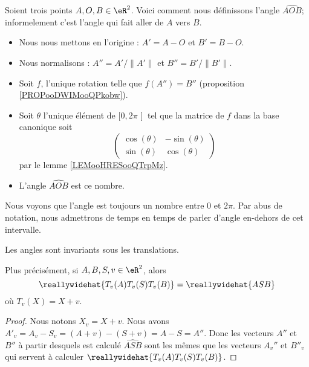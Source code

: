 \begin{definition}      \label{DEFooUPUUooKAPFrh}
    Soient trois points \( A,O,B\in \eR^2\). Voici comment nous définissons l'angle \( \widehat{AOB}\); informelement c'est l'angle qui fait aller de \( A\) vers \( B\).
    \begin{itemize}
        \item Nous nous mettons en l'origine : \( A'=A-O\) et \( B'=B-O\).
        \item Nous normalisons : \( A''=A'/\| A' \|\) et \( B''=B'/\| B' \|\).
        \item Soit \( f\), l'unique rotation telle que \( f(A'')=B''\) (proposition \ref{PROPooDWIMooQPkobw}).
        \item Soit \( \theta\) l'unique élément de \( \mathopen[ 0 , 2\pi \mathclose[\) tel que la matrice de \( f\) dans la base canonique soit
    \begin{equation}
        \begin{pmatrix}
            \cos(\theta)    &   -\sin(\theta)    \\
            \sin(\theta)    &   \cos(\theta)
        \end{pmatrix}
    \end{equation}
    par le lemme \ref{LEMooHRESooQTrpMz}.
\item L'angle \( \widehat{AOB}\) est ce nombre.
    \end{itemize}
\end{definition}

Nous voyons que l'angle est toujours un nombre entre \( 0\) et \( 2\pi\). Par abus de notation, nous admettrons de temps en temps de parler d'angle en-dehors de cet intervalle.

\begin{proposition}      \label{PROPooKVSHooRODGWE}
    Les angles sont invariants sous les translations. 

    Plus précisément, si \( A,B,S,v\in \eR^2\), alors
    \begin{equation}
        \reallywidehat{T_v(A)T_v(S)T_v(B)}=\reallywidehat{ASB}
    \end{equation}
    où \( T_v(X)=X+v\).
\end{proposition}

\begin{proof}
    Nous notons \( X_v=X+v\). Nous avons \( A'_v=A_v-S_v=(A+v)-(S+v)=A-S=A''\). Donc les vecteurs \( A''\) et \( B''\) à partir desquels est calculé \( \widehat{ASB}\) sont les mêmes que les vecteurs \(  A_v'' \) et \( B''_v\) qui servent à calculer \( \reallywidehat{T_v(A)T_v(S)T_v(B)}\).
\end{proof}

